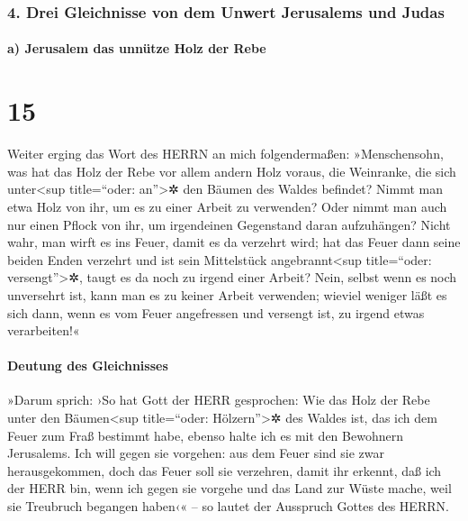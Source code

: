 \hypertarget{drei-gleichnisse-von-dem-unwert-jerusalems-und-judas}{%
\subsubsection{4. Drei Gleichnisse von dem Unwert Jerusalems und
Judas}\label{drei-gleichnisse-von-dem-unwert-jerusalems-und-judas}}

\hypertarget{a-jerusalem-das-unnuxfctze-holz-der-rebe}{%
\paragraph{a) Jerusalem das unnütze Holz der
Rebe}\label{a-jerusalem-das-unnuxfctze-holz-der-rebe}}

\hypertarget{section-14}{%
\section{15}\label{section-14}}

Weiter erging das Wort des HERRN an mich folgendermaßen:
»Menschensohn, was hat das Holz der Rebe vor allem andern
Holz voraus, die Weinranke, die sich unter\textless sup title=``oder:
an''\textgreater✲ den Bäumen des Waldes befindet? Nimmt
man etwa Holz von ihr, um es zu einer Arbeit zu verwenden? Oder nimmt
man auch nur einen Pflock von ihr, um irgendeinen Gegenstand daran
aufzuhängen? Nicht wahr, man wirft es ins Feuer, damit es
da verzehrt wird; hat das Feuer dann seine beiden Enden verzehrt und ist
sein Mittelstück angebrannt\textless sup title=``oder:
versengt''\textgreater✲, taugt es da noch zu irgend einer Arbeit?
Nein, selbst wenn es noch unversehrt ist, kann man es zu
keiner Arbeit verwenden; wieviel weniger läßt es sich dann, wenn es vom
Feuer angefressen und versengt ist, zu irgend etwas verarbeiten!«

\hypertarget{deutung-des-gleichnisses}{%
\paragraph{Deutung des Gleichnisses}\label{deutung-des-gleichnisses}}

»Darum sprich: ›So hat Gott der HERR gesprochen: Wie das
Holz der Rebe unter den Bäumen\textless sup title=``oder:
Hölzern''\textgreater✲ des Waldes ist, das ich dem Feuer zum Fraß
bestimmt habe, ebenso halte ich es mit den Bewohnern Jerusalems.
Ich will gegen sie vorgehen: aus dem Feuer sind sie zwar
herausgekommen, doch das Feuer soll sie verzehren, damit ihr erkennt,
daß ich der HERR bin, wenn ich gegen sie vorgehe und das
Land zur Wüste mache, weil sie Treubruch begangen haben‹« -- so lautet
der Ausspruch Gottes des HERRN.

